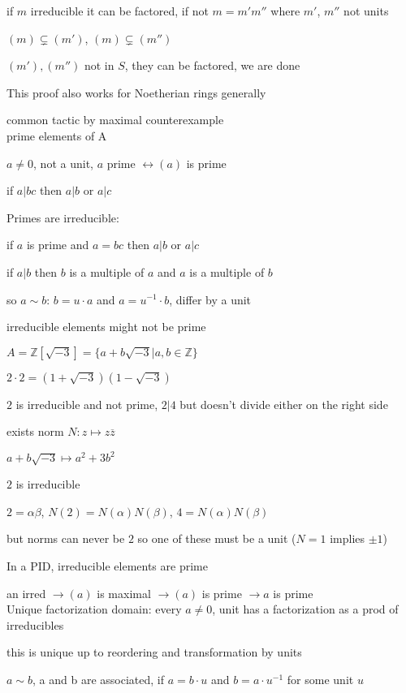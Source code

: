 \documentclass[12pt]{article}
\begin{document}
if $m$ irreducible it can be factored, if not $m = m'm''$ where $m'$, $m''$ not units

$(m) \subsetneq (m')$, $(m) \subsetneq (m'')$

$(m'), (m'')$ not in $S$, they can be factored, we are done

\noindent
This proof also works for Noetherian rings generally

\noindent
common tactic by maximal counterexample\\

\noindent
prime elements of A

$a \neq 0$, not a unit, $a$ prime $\leftrightarrow (a)$ is prime

if $a | bc$ then $a | b$ or $a | c$

\noindent
Primes are irreducible:

if $a$ is prime and $a = bc$ then $a|b$ or $a|c$

if $a|b$ then $b$ is a multiple of $a$ and $a$ is a multiple of $b$

so $a \sim b$: $b = u \cdot a$ and $a = u^{-1} \cdot b$, differ by a unit

\noindent
irreducible elements might not be prime

$A = \mathds{Z}[\sqrt{-3}] = \{a + b\sqrt{-3} | a, b \in \mathds{Z}\}$

$2 \cdot 2 = (1 + \sqrt{-3})(1 - \sqrt{-3})$

$2$ is irreducible and not prime, $2 | 4$ but doesn't divide either on the right side

exists norm $N: z \mapsto z\overline{z}$

$a + b\sqrt{-3} \mapsto a^2 + 3b^2$

$2$ is irreducible

$2 = \alpha\beta$, $N(2) = N(\alpha)N(\beta)$, $4 = N(\alpha)N(\beta)$

but norms can never be $2$ so one of these must be a unit ($N = 1$ implies $\pm 1$)

\noindent
In a PID, irreducible elements are prime

an irred $\to (a)$ is maximal $\to (a)$ is prime $\to a$ is prime\\

\noindent
Unique factorization domain: every $a \neq 0$, unit has a factorization as a prod of irreducibles

this is unique up to reordering and transformation by units

$a \sim b$, a and b are associated, if $a = b \cdot u$ and $b = a \cdot u^{-1}$ for some unit $u$
\end{document}
